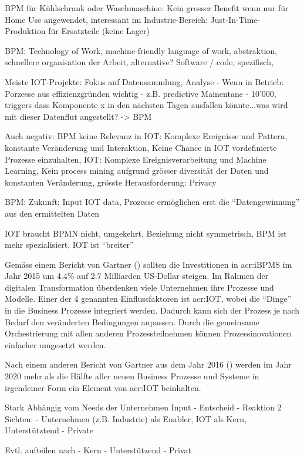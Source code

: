 BPM für Kühlschrank oder Waschmaschine: Kein grosser Benefit wenn nur für Home Use angewendet, interessant im Industrie-Bereich: Just-In-Time-Produktion für Ersatzteile (keine Lager)

BPM: Technology of Work, machine-friendly language of work, abstraktion, schnellere organisation der Arbeit, alternative? Software / code, spezifisch,

Meiste IOT-Projekte: Fokus auf Datensammlung, Analyse - Wenn in Betrieb: Porzesse aus effizienzgründen wichtig - z.B. predictive Mainentane - 10'000, triggers dass Komponente x in den nächsten Tagen ausfallen könnte...was wird mit dieser Datenflut angestellt? -> BPM

Auch negativ: BPM keine Relevanz in IOT: Komplexe Ereignisse und Pattern, konstante Veränderung und Interaktion, Keine Chance in IOT vordefinierte Prozesse einzuhalten, IOT: Komplexe Ereignisverarbeitung und Machine Learning, Kein process mining aufgrund grösser diversität der Daten und konstanten Veränderung, grösste Herausforderung: Privacy

BPM: Zukunft: Input IOT data, Prozesse ermöglichen erst die "`Datengewinnung"' aus den ermittelten Daten

IOT braucht BPMN nicht, umgekehrt, Beziehung nicht symmetrisch, BPM ist mehr spezialisiert, IOT ist "`breiter"'

Gemäss einem Bericht von Gartner (\cite{E:Gartner:BPM:2015}) sollten die Investitionen in \gls{acr:iBPMS} im Jahr 2015 um 4.4\% auf 2.7 Milliarden US-Dollar steigen. Im Rahmen der digitalen Transformation überdenken viele Unternehmen ihre Prozesse und Modelle. Einer der 4 genannten Einflussfaktoren ist \gls{acr:IOT}, wobei die "`Dinge"' in die Business Prozesse integriert werden. Dadurch kann sich der Prozess je nach Bedarf den veränderten Bedingungen anpassen. Durch die gemeinsame Orchestrierung mit allen anderen Prozessteilnehmen können Prozessinovationen einfacher umgesetzt werden.

Nach einem anderen Bericht von Gartner aus dem Jahr 2016 (\cite{E:Gartner:BPM:IOT:2020}) werden im Jahr 2020 mehr als die Hälfte aller neuen Business Prozesse und Systeme in irgendeiner Form ein Element von \gls{acr:IOT} beinhalten.

Stark Abhängig vom Needs der Unternehmen
Input - Entscheid - Reaktion
2 Sichten:
	- Unternehmen (z.B. Industrie) als Enabler, IOT als Kern, Unterstütztend
	- Private 
	
Evtl. aufteilen nach
	- Kern
	- Unterstützend
	- Privat
	


